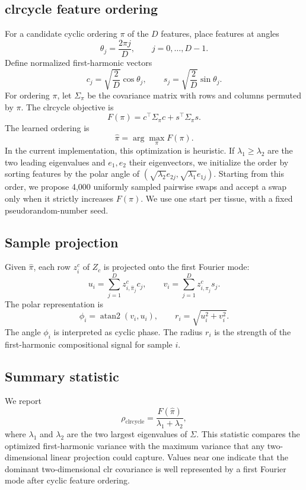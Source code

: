\documentclass[10pt,twocolumn]{article}
\begin{document}
\subsection{clrcycle feature ordering}

For a candidate cyclic ordering \(\pi\) of the \(D\) features, place features at
angles
\[
\theta_j = \frac{2\pi j}{D}, \qquad j=0,\ldots,D-1.
\]
Define normalized first-harmonic vectors
\[
c_j = \sqrt{\frac{2}{D}}\cos\theta_j,
\qquad
s_j = \sqrt{\frac{2}{D}}\sin\theta_j.
\]
For ordering \(\pi\), let \(\Sigma_\pi\) be the covariance matrix with rows and
columns permuted by \(\pi\). The clrcycle objective is
\[
F(\pi) = c^\top \Sigma_\pi c + s^\top \Sigma_\pi s.
\]
The learned ordering is
\[
\hat{\pi} = \arg\max_\pi F(\pi).
\]
In the current implementation, this optimization is heuristic. If
\(\lambda_1\geq\lambda_2\) are the two leading eigenvalues and
\(e_1,e_2\) their eigenvectors, we initialize the order by sorting features by
the polar angle of \((\sqrt{\lambda_2}e_{2j},\sqrt{\lambda_1}e_{1j})\). Starting
from this order, we propose 4,000 uniformly sampled pairwise swaps and accept a
swap only when it strictly increases \(F(\pi)\). We use one start per tissue,
with a fixed pseudorandom-number seed.

\subsection{Sample projection}

Given \(\hat{\pi}\), each row \(z^c_i\) of \(Z_c\) is projected onto the first
Fourier mode:
\[
u_i = \sum_{j=1}^{D} z^c_{i,\hat{\pi}_j} c_j,
\qquad
v_i = \sum_{j=1}^{D} z^c_{i,\hat{\pi}_j} s_j.
\]
The polar representation is
\[
\phi_i = \operatorname{atan2}(v_i,u_i),
\qquad
r_i = \sqrt{u_i^2+v_i^2}.
\]
The angle \(\phi_i\) is interpreted as cyclic phase. The radius \(r_i\) is the
strength of the first-harmonic compositional signal for sample \(i\).

\subsection{Summary statistic}

We report
\[
\rho_{\mathrm{clrcycle}}
= \frac{F(\hat{\pi})}{\lambda_1+\lambda_2},
\]
where \(\lambda_1\) and \(\lambda_2\) are the two largest eigenvalues of
\(\Sigma\). This statistic compares the optimized first-harmonic variance with
the maximum variance that any two-dimensional linear projection could capture.
Values near one indicate that the dominant two-dimensional clr covariance is
well represented by a first Fourier mode after cyclic feature ordering.
\end{document}
